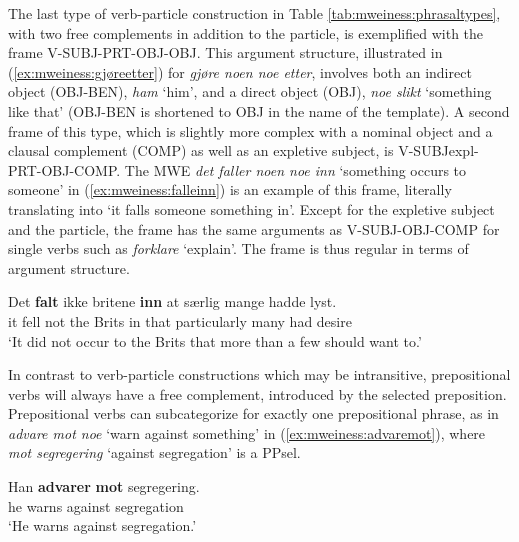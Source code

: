 \documentclass[output=paper]{langsci/langscibook}
\begin{document}
The last type of verb-particle construction in Table \ref{tab:mweiness:phrasaltypes}, with two free complements in addition to the particle, is exemplified with the frame V-SUBJ-PRT-OBJ-OBJ.
This argument structure, illustrated in (\ref{ex:mweiness:gjøreetter}) for \emph{gjøre noen noe etter}, involves both an indirect object (OBJ-BEN), \emph{ham} `him', and a direct object (OBJ), \emph{noe slikt} `something like that' (OBJ-BEN is shortened to OBJ in the name of the template).
A second frame of this type, which is slightly more complex with a nominal object and a clausal complement (COMP) as well as an expletive subject, is V-SUBJexpl-PRT-OBJ-COMP. 
The MWE \emph{det faller noen noe inn} `something occurs to someone' in (\ref{ex:mweiness:falleinn}) is an example of this frame, literally translating into `it falls someone something in'.
Except for the expletive subject and the particle, the frame has the same arguments as V-SUBJ-OBJ-COMP for single verbs such as \emph{forklare} `explain'.
The frame is thus regular in terms of argument structure.   

\ea\label{ex:mweiness:falleinn}
\gll   Det \textbf{falt} ikke britene \textbf{inn} at særlig mange hadde lyst. \\
        it fell not {the Brits} in that particularly many had desire \\
\glt  `It did not occur to the Brits that more than a few should want to.' \\ 
\z

In contrast to verb-particle constructions which may be intransitive, prepositional verbs will always have a free complement, introduced by the selected preposition.
Prepositional verbs can subcategorize for exactly one prepositional phrase, as in
\emph{advare mot noe} `warn against something' in (\ref{ex:mweiness:advaremot}), where \emph{mot segregering} `against segregation' is a PPsel. 

\ea\label{ex:mweiness:advaremot}
\gll   Han \textbf{advarer} \textbf{mot} segregering. \\
        he warns against segregation\\
\glt  `He warns against segregation.' \\ 
\z
\end{document}

